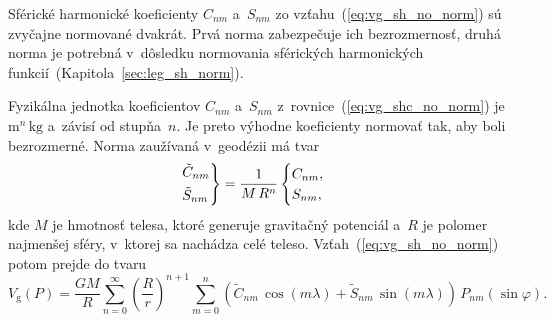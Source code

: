 \documentclass[a4paper,12pt]{book}
\newcommand{\gidx}{\mathrm g}
\begin{document}
Sférické harmonické koeficienty $C_{nm}$ a~$S_{nm}$ zo
vzťahu~(\ref{eq:vg_sh_no_norm}) sú zvyčajne normované dvakrát.  Prvá norma
zabezpečuje ich bezrozmernosť, druhá norma je potrebná v~dôsledku normovania 
sférických harmonických funkcií~(Kapitola~\ref{sec:leg_sh_norm}).

Fyzikálna jednotka koeficientov $C_{nm}$ a~$S_{nm}$
z~rovnice~(\ref{eq:vg_shc_no_norm}) je $\mathrm{m}^n \, \mathrm{kg}$ a~závisí 
od stupňa~$n$.  Je preto výhodne koeficienty normovať tak, aby boli
bezrozmerné.  Norma zaužívaná v~geodézii má tvar
%
\begin{equation}
\label{eq:cnm_snm_1st_norm}
\begin{rcases}
\tilde{C}_{nm}\\
\tilde{S}_{nm}
\end{rcases}
= \frac{1}{M \, R^n}
\begin{cases}
C_{nm}{,}\\
S_{nm}{,}
\end{cases}
\end{equation}
%
kde $M$ je hmotnosť telesa, ktoré generuje gravitačný potenciál a~$R$ je
polomer najmenšej sféry, v~ktorej sa nachádza celé teleso.  
Vzťah~(\ref{eq:vg_sh_no_norm})
potom prejde do tvaru
%
\begin{equation}
\label{eq:vg_sh_1st_norm}
V_\gidx(P) = \frac{GM}{R} \sum_{n = 0}^\infty \left( \frac{R}{r} \right)^{n
+ 1} \sum_{m = 0}^{n} \left( \tilde{C}_{nm} \, \cos(m\lambda) + \tilde{S}_{nm}
\, \sin(m\lambda)\right) \, P_{nm}(\sin\varphi){.}
\end{equation}
\end{document}
